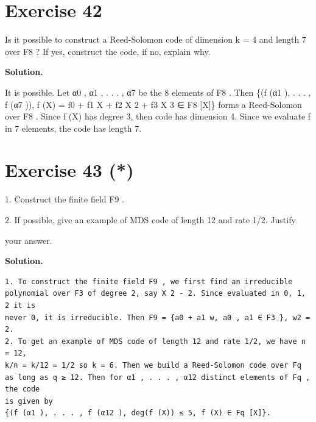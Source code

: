 \documentclass[11pt]{article}
\begin{document}
\section*{Exercise 42}
\begin{exercisebox}
Is it possible to construct a Reed-Solomon code of dimension k = 4 and length 7 over F8 ? If yes, construct the code, if no, explain why.

\end{exercisebox}
\begin{solutionbox}
\textbf{Solution.}

It is possible. Let α0 , α1 , . . . , α7 be the 8 elements of F8 . Then \{(f (α1 ), . . . , f (α7 )), f (X) = f0 + f1 X + f2 X 2 + f3 X 3 ∈ F8 [X]\} forms a Reed-Solomon over F8 . Since f (X) has degree 3, then code has dimension 4. Since we evaluate f in 7 elements, the code has length 7.

\end{solutionbox}
\section*{Exercise 43 (*)}
\begin{exercisebox}
1. Construct the finite field F9 .

2. If possible, give an example of MDS code of length 12 and rate 1/2. Justify

your answer.

\end{exercisebox}
\begin{solutionbox}
\textbf{Solution.}

\begin{Verbatim}[fontsize=\small]
1. To construct the finite field F9 , we first find an irreducible
polynomial over F3 of degree 2, say X 2 - 2. Since evaluated in 0, 1, 2 it is
never 0, it is irreducible. Then F9 = {a0 + a1 w, a0 , a1 ∈ F3 }, w2 = 2.
2. To get an example of MDS code of length 12 and rate 1/2, we have n = 12,
k/n = k/12 = 1/2 so k = 6. Then we build a Reed-Solomon code over Fq
as long as q ≥ 12. Then for α1 , . . . , α12 distinct elements of Fq , the code
is given by
{(f (α1 ), . . . , f (α12 ), deg(f (X)) ≤ 5, f (X) ∈ Fq [X]}.
\end{Verbatim}
\end{solutionbox}
\end{document}
